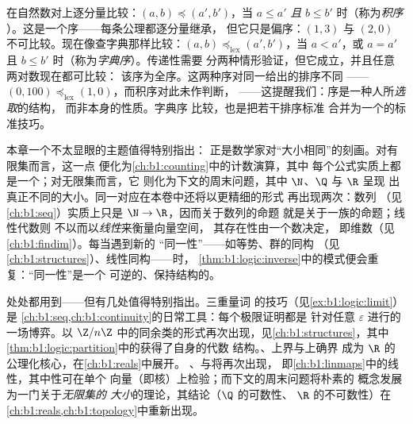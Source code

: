 \begin{example}[网格 $\N^2$ 上的两种序]\label{ex:b1:logic:lexorder}
在自然数对上逐分量比较：$(a, b) \preceq (a',
b')$，当 $a \leq a'$ \emph{且} $b \leq b'$ 时（称为\emph{积序}
）。这是一个序——每条公理都逐分量继承，
但它只是偏序：$(1, 3)$ 与 $(2, 0)$
不可比较。现在像查字典那样比较：$(a, b)
\preceq_{\mathrm{lex}} (a', b')$，当 $a < a'$，或 $a = a'$ 且 $b
\leq b'$ 时（称为\emph{字典序}）。传递性需要
分两种情形验证，但它成立，并且任意两对数现在都可比较：
该序为全序。这两种序对同一给出的排序不同
——$(0, 100) \preceq_{\mathrm{lex}} (1, 0)$，而积序对此未作判断，
——这提醒我们：序是一种人所\emph{选取}的结构，
而非本身的性质。字典序
比较，也是把若干排序标准
合并为一个的标准技巧。
\end{example}

\begin{remark}[插曲：以双射刻画大小]\label{rem:b1:logic:interlude}
本章一个不太显眼的主题值得特别指出：
正是数学家对“大小相同”的刻画。对有限集而言，这一点
便化为\cref{ch:b1:counting}中的计数演算，其中
每个公式实质上都是一个；对无限集而言，它
则化为下文的周末问题，其中 $\N$、$\Q$ 与 $\R$ 呈现
出真正不同的大小。同一对应在本卷中还将以更精细的形式
再出现两次：数列
（见\cref{ch:b1:seq}）实质上只是 $\N \to \R$，因而关于数列的命题
就是关于一族的命题；线性代数则
不以而以\emph{线性}来衡量向量空间，
其存在性由一个数决定，
即维数（见\cref{ch:b1:findim}）。每当遇到新的
“同一性”——如等势、群的同构
（见\cref{ch:b1:structures}）、线性同构——时，
\cref{thm:b1:logic:inverse}中的模式便会重复：“同一性”是一个
可逆的、保持结构的。
\end{remark}

\begin{remark}[本章的应用]\label{rem:b1:logic:whereused}
处处都用到——但有几处值得特别指出。三重量词
的技巧（见\cref{ex:b1:logic:limit}）是
\cref{ch:b1:seq,ch:b1:continuity}的日常工具：每个极限证明都是
针对任意 $\varepsilon$ 进行的一场博弈。以
$\Z/n\Z$ 中的同余类的形式再次出现，见\cref{ch:b1:structures}，其中
\cref{thm:b1:logic:partition}中的获得了自身的代数
结构。、上界与上确界
成为 $\R$ 的公理化核心，在\cref{ch:b1:reals}中展开。
、与将再次出现，
即\cref{ch:b1:linmaps}中的线性，其中性可在单个
向量（即核）上检验；而下文的周末问题将朴素的
概念发展为一门关于\emph{无限集的
大小}的理论，其结论（$\Q$ 的可数性、
$\R$ 的不可数性）在\cref{ch:b1:reals,ch:b1:topology}中重新出现。
\end{remark}

